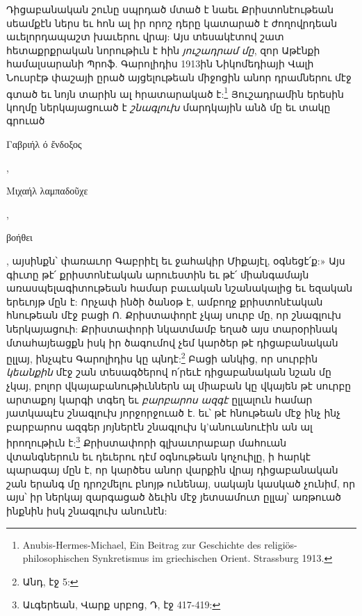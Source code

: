 \documentclass{article}
\begin{document}
{Դիցաբանական շունը սպրդած մտած է նաեւ Քրիստոնէութեան սեամքէն ներս եւ հոն ալ իր որոշ դերը կատարած է ժողովրդեան աւելորդապաշտ խաւերու վրայ: Այս տեսակէտով շատ հետաքրքրական նորութիւն է հին \emph{յուշադրամ մը}, զոր Աթէնքի համալսարանի Պրոֆ. Գարոլիդիս 1913ին Նիկոմեդիայի Վալի Նուսրէթ փաշայի ըրած այցելութեան միջոցին անոր դրամներու մէջ գտած եւ նոյն տարին ալ հրատարակած է:\footnote{Anubis-Hermes-Michael, Ein Beitrag zur Geschichte des religiös-philosophischen Synkretismus im griechischen Orient. Strassburg 1913.} Յուշադրամին երեսին կողմը ներկայացուած է \emph{շնագլուխ} մարդկային անձ մը եւ տակը գրուած \begin{greek}Γαβριήλ ό ἔνδοξος\end{greek}, \begin{greek}Μιχαήλ λαμπαδοῦχε\end{greek}, \begin{greek}βοήθει\end{greek}, այսինքն՝ փառաւոր Գաբրիէլ եւ ջահակիր Միքայէլ, օգնեցէ՛ք:» Այս գիւտը թէ՛ քրիստոնէական արուեստին եւ թէ՛ միանգամայն առասպելագիտութեան համար բաւական նշանակալից եւ եզական երեւոյթ մըն է: Որչափ ինծի ծանօթ է, ամբողջ քրիստոնէական հնութեան մէջ բացի Ո. Քրիստափորէ չկայ սուրբ մը, որ շնագլուխ ներկայացուի: Քրիստափորի նկատմամբ եղած այս տարօրինակ մտահայեացքն իսկ իր ծագումով չեմ կարծեր թէ դիցաբանական ըլլայ, ինչպէս Գարոլիդիս կը պնդէ:\footnote{Անդ, էջ 5:} Բացի անկից, որ սուրբին \emph{կեանքին} մէջ շան տեսագծերով ո՛րեւէ դիցաբանական նշան մը չկայ, բոլոր վկայաբանութիւններն ալ միաբան կը վկայեն թէ սուրբը արտաքոյ կարգի տգեղ եւ \emph{բարբարոս ազգէ} ըլլալուն համար յատկապէս շնագլուխ յորջորջուած է. եւ՝ թէ հնութեան մէջ ինչ ինչ բարբարոս ազգեր յոյներէն շնագլուխ կ'անուանուէին ան ալ իրողութիւն է:\footnote{Աւգերեան, Վարք սրբոց, Դ, էջ 417-419:} Քրիստափորի գլխաւորաբար մահուան վտանգներուն եւ դեւերու դէմ օգնութեան կոչուիլը, ի հարկէ պարագայ մըն է, որ կարծես անոր վարքին վրայ դիցաբանական շան երանգ մը դրոշմելու բնոյթ ունենայ, սակայն կասկած չունիմ, որ այս՝ իր ներկայ զարգացած ձեւին մէջ յետսամուտ ըլլայ՝ առթուած ինքնին իսկ շնագլուխ անունէն:

}
\end{document}
